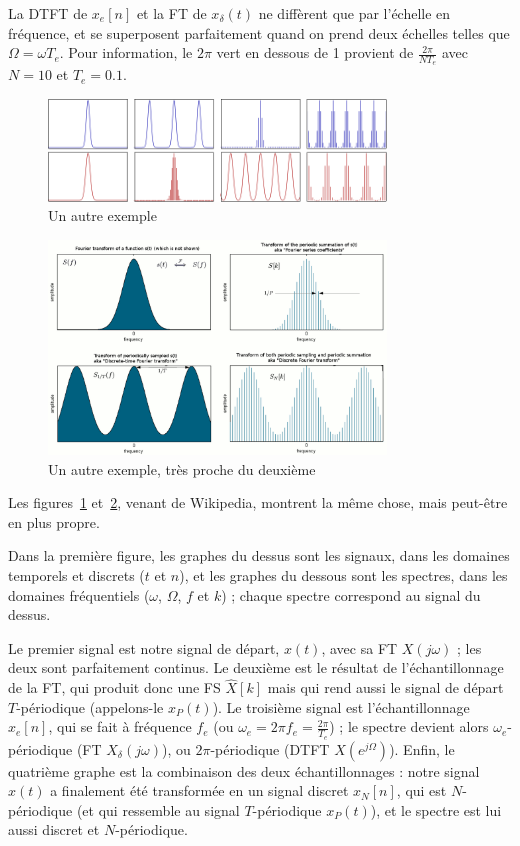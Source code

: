 \documentclass{article}
\begin{document}
La DTFT de $x_e[n]$ et la FT de $x_\delta(t)$ ne diffèrent que par l'échelle en fréquence, et se superposent parfaitement quand on prend deux échelles telles que $\Omega = \omega T_e$. Pour information, le $2\pi$ vert en dessous de 1 provient de $\frac{2\pi}{N T_e}$ avec $N=10$ et $T_e=0.1$.

\begin{figure}
	\centering
	\includegraphics[width=0.8\textwidth]{From_Continuous_To_Discrete_Fourier_Transform.png}
	\caption{Un autre exemple}
	\label{fig:signalspectra2}
\end{figure}
\begin{figure}
	\centering
	\includegraphics[width=0.8\textwidth]{Fourier_transform,_Fourier_series,_DTFT,_DFT.png}
	\caption{Un autre exemple, très proche du deuxième}
	\label{fig:signalspectra3}
\end{figure}

Les figures~\ref{fig:signalspectra2} et~\ref{fig:signalspectra3}, venant de Wikipedia, montrent la même chose, mais peut-être en plus propre.

Dans la première figure, les graphes du dessus sont les signaux, dans les domaines temporels et discrets ($t$ et $n$), et les graphes du dessous sont les spectres, dans les domaines fréquentiels ($\omega$, $\Omega$, $f$ et $k$) ; chaque spectre correspond au signal du dessus.

Le premier signal est notre signal de départ, $x(t)$, avec sa FT $X(j\omega)$ ; les deux sont parfaitement continus. Le deuxième est le résultat de l'échantillonnage de la FT, qui produit donc une FS $\hat{X}[k]$ mais qui rend aussi le signal de départ $T$-périodique (appelons-le $x_P(t)$). Le troisième signal est l'échantillonnage $x_e[n]$, qui se fait à fréquence $f_e$ (ou $\omega_e=2\pi f_e=\frac{2\pi}{T_e}$) ; le spectre devient alors $\omega_e$-périodique (FT $X_\delta(j\omega)$), ou $2\pi$-périodique (DTFT $X\left(e^{j\Omega}\right)$). Enfin, le quatrième graphe est la combinaison des deux échantillonnages : notre signal $x(t)$ a finalement été transformée en un signal discret $x_N[n]$, qui est $N$-périodique (et qui ressemble au signal $T$-périodique $x_P(t)$), et le spectre est lui aussi discret et $N$-périodique.
\end{document}
